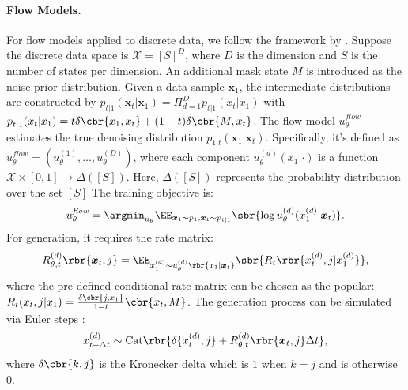 \paragraph{Flow Models.} For flow models applied to discrete data, we follow the framework by \citet{campbell2024generative}. Suppose the discrete data space is $\mathcal{X}  = [S]^D$, where $D$ is the dimension and $S$ is the number of states per dimension.  An additional mask state $M$ is introduced as the noise prior distribution. Given a data sample $\boldsymbol{x}_1$, the intermediate distributions are constructed by $p_{t|1}(\boldsymbol{x}_t| \boldsymbol{x}_1) = \Pi_{d=1}^D p_{t|1}(x_t|x_1) $ with $p_{t|1}(x_t|x_1) = t \delta \cbr{x_1, x_t} + (1-t)\delta \cbr{M, x_t} $. The flow model $u_\theta^{\textit{flow}}$ estimates the true denoising distribution $p_{1|t}(\boldsymbol{x}_1|\boldsymbol{x}_t)$. Specifically, it's defined as $u_\theta^{\textit{flow}} = (u_\theta^{(1)},\ldots,u_\theta^{(D)})$, where each component $u_\theta^{(d)}(x_1|\cdot)$ is a function $ \mathcal{X} \times [0,1]\to \Delta([S]) $. Here, $\Delta([S])$ represents the probability distribution over the set $[S]$ The training objective is:
\begin{equation}\label{eq:flow train obj}
   u_\theta^{\textit{flow}}= \argmin_{u_\theta} \EE_{\boldsymbol{x}_1 \sim p_1, \boldsymbol{x}_t \sim p_{t|1}}\sbr{\log u_{\theta}^{(d)}(x_1^{(d)}|\boldsymbol{x}_t)}.
\end{equation}
For generation, it requires the rate matrix:
\begin{equation}\label{eq:compute rate matrix}
     R_{\theta,t}^{(d)} \rbr{\boldsymbol{x}_t, j} = \EE_{{x}_1^{(d)} \sim u_{\theta}^{(d)}\rbr{{x}_1\mid \boldsymbol{x}_t}}\sbr{R_t\rbr{x_t^{(d)}, j|x_1^{(d)}}},
\end{equation}
where the pre-defined conditional rate matrix can be chosen as the popular: $R_t(x_t,j|x_1) = \frac{\delta \cbr{j,x_1}}{1-t} \cbr{x_t, M}$. The generation process can be simulated via Euler steps \citep{sun2022score}:
\begin{equation}\label{eq:discrete euler sampling}
    {x}_{t+\Delta t}^{(d)} \sim  \text{Cat}\rbr{\delta \{{x}_t^{(d)}, j \} + R_{\theta, t}^{(d)}\rbr{\boldsymbol{x}_t, j} \Delta t },
\end{equation}
where $ \delta\cbr{k, j}$  is the Kronecker delta which is $1$ when $k = j$ and is otherwise $0$.






